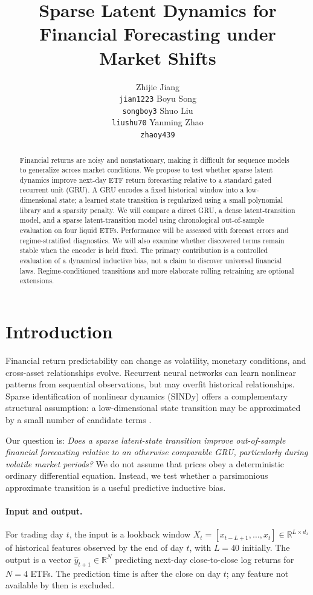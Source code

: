 \documentclass{article}
\title{Sparse Latent Dynamics for Financial Forecasting under Market Shifts}
\author{%
  Zhijie Jiang \\ \texttt{jian1223} \And
  Boyu Song \\ \texttt{songboy3} \And
  Shuo Liu \\ \texttt{liushu70} \And
  Yanming Zhao \\ \texttt{zhaoy439}
}
\begin{document}
\maketitle

\begin{abstract}
Financial returns are noisy and nonstationary, making it difficult for sequence models to generalize across market conditions. We propose to test whether sparse latent dynamics improve next-day ETF return forecasting relative to a standard gated recurrent unit (GRU). A GRU encodes a fixed historical window into a low-dimensional state; a learned state transition is regularized using a small polynomial library and a sparsity penalty. We will compare a direct GRU, a dense latent-transition model, and a sparse latent-transition model using chronological out-of-sample evaluation on four liquid ETFs. Performance will be assessed with forecast errors and regime-stratified diagnostics. We will also examine whether discovered terms remain stable when the encoder is held fixed. The primary contribution is a controlled evaluation of a dynamical inductive bias, not a claim to discover universal financial laws. Regime-conditioned transitions and more elaborate rolling retraining are optional extensions.
\end{abstract}

\section{Introduction}
Financial return predictability can change as volatility, monetary conditions, and cross-asset relationships evolve. Recurrent neural networks can learn nonlinear patterns from sequential observations, but may overfit historical relationships. Sparse identification of nonlinear dynamics (SINDy) offers a complementary structural assumption: a low-dimensional state transition may be approximated by a small number of candidate terms \citep{brunton2016}.

Our question is: \emph{Does a sparse latent-state transition improve out-of-sample financial forecasting relative to an otherwise comparable GRU, particularly during volatile market periods?} We do not assume that prices obey a deterministic ordinary differential equation. Instead, we test whether a parsimonious approximate transition is a useful predictive inductive bias.

\paragraph{Input and output.}
For trading day $t$, the input is a lookback window $X_t=[x_{t-L+1},\ldots,x_t]\in\mathbb{R}^{L\times d_x}$ of historical features observed by the end of day $t$, with $L=40$ initially. The output is a vector $\hat y_{t+1}\in\mathbb{R}^{N}$ predicting next-day close-to-close log returns for $N=4$ ETFs. The prediction time is after the close on day $t$; any feature not available by then is excluded.
\end{document}
